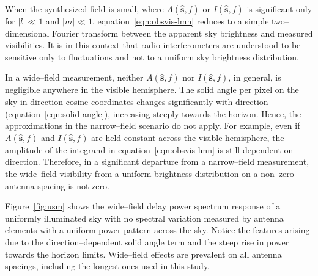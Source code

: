 \documentclass[preprint2,iop,numberedappendix]{emulateapj}
\begin{document}
When the synthesized field is small, where $A(\hat{\boldsymbol{s}},f)$ or $I(\hat{\boldsymbol{s}},f)$ is significant only for $|l| \ll 1$ and $|m| \ll 1$, equation~\ref{eqn:obsvis-lmn} reduces to a simple two--dimensional Fourier transform \citep{tay99,tho01} between the apparent sky brightness and measured visibilities. It is in this context that radio interferometers are understood to be sensitive only to fluctuations and not to a uniform sky brightness distribution. 

In a wide--field measurement, neither $A(\hat{\boldsymbol{s}},f)$ nor $I(\hat{\boldsymbol{s}},f)$, in general, is negligible anywhere in the visible hemisphere. The solid angle per pixel on the sky in direction cosine coordinates changes significantly with direction (equation~\ref{eqn:solid-angle}), increasing steeply towards the horizon. Hence, the approximations in the narrow--field scenario do not apply. For example, even if $A(\hat{\boldsymbol{s}},f)$ and $I(\hat{\boldsymbol{s}},f)$ are held constant across the visible hemisphere, the amplitude of the integrand in equation~\ref{eqn:obsvis-lmn} is still dependent on direction. Therefore, in a significant departure from a narrow--field measurement, the wide--field visibility from a uniform brightness distribution on a non--zero antenna spacing is not zero.

Figure~\ref{fig:usm} shows the wide--field delay power spectrum response of a uniformly illuminated sky with no spectral variation measured by antenna elements with a uniform power pattern across the sky. Notice the features arising due to the direction--dependent solid angle term and the steep rise in power towards the horizon limits. Wide--field effects are prevalent on all antenna spacings, including the longest ones used in this study. 
\end{document}
